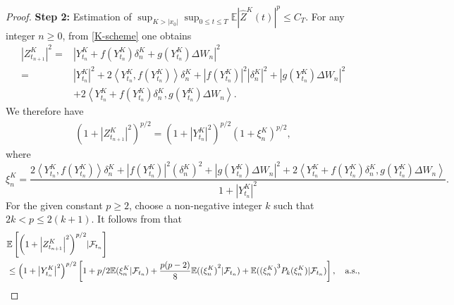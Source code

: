 \documentclass[preprint,12pt,compress]{elsarticle}
\begin{document}
\begin{proof}
\textbf{Step 2:} Estimation of ${\sup _{K > |{x_0}|}}{\sup _{0 \le t \le T}}\mathbb{E}{| {{{\hat Z}^K}(t)} |^p} \le {C_T}$.
For any integer $n \ge 0$, from \eqref{K-scheme} one obtains
	\begin{equation}  \label{a1}
		\begin{split}
			{\left| {Z_{{t_{n + 1}}}^K} \right|^2} =& {\left| {Y_{{t_n}}^K + f(Y_{{t_n}}^K){\delta _n^{K }} + g(Y_{{t_n}}^K)\Delta {W_n}} \right|^2} \\
			=& {\left| {{Y_{{t_n}}^K}} \right|^2} + 2\left\langle {{Y_{{t_n}}^K},f({Y_{{t_n}}^K})} \right\rangle \delta _n^{K }  + {\left| {f({Y_{{t_n}}^K})} \right|^2}{\left| {\delta _n^{K } } \right|^2} + {\left| {g(Y_{{t_n}}^K)\Delta {W_n}} \right|^2} \\
			&+ 2\left\langle {{Y_{{t_n}}^K} + f({Y_{{t_n}}^K})\delta _n^{K } ,g({Y_{{t_n}}^K})\Delta {W_n}} \right\rangle .
		\end{split}
	\end{equation}
	We therefore have
	\begin{equation}  \label{a6}
		\begin{split}
			{\left( {1 + {{\left| {Z_{{t_{n + 1}}}^K} \right|}^2}} \right)^{p/2}} = {\left( {1 + {{\left| {Y_{{t_n}}^K} \right|}^2}} \right)^{p/2}}{\left( {1 + \xi _n^{K }} \right)^{p/2}},
		\end{split}
	\end{equation}
	where
	\begin{equation}  \label{a26}
		\xi _n^{K } = \frac{{2\left\langle {Y_{{t_n}}^K,f(Y_{{t_n}}^K)} \right\rangle \delta _n^{K } + {{\left| {f(Y_{{t_n}}^K)} \right|}^2}{{\left( {\delta _n^{K }} \right)}^2} + {\left| {g(Y_{{t_n}}^K)\Delta {W_n}} \right|^2} + 2\left\langle {Y_{{t_n}}^K + f(Y_{{t_n}}^K)\delta _n^{K },g(Y_{{t_n}}^K)\Delta {W_n}} \right\rangle }}{{1 + {{\left| {Y_{{t_n}}^K} \right|}^2}}}.
	\end{equation}
	For the given constant $p \ge 2$, choose a non-negative integer $k$ such that $2k < p \le 2(k+1)$. It follows from \cite[Lemma 3.3]{yang2018explicit} that
	\begin{equation}  \label{sum1}
	\begin{split}
		&\mathbb{E}\left[ {{{\left( {1 + {{\left| {{Z_{{t_{n + 1}}}^K}} \right|}^2}} \right)}^{p/2}}|{{\cal F}_{{t_n}}}} \right] \\
		&\le {\left( {1 + {{\left| {{Y_{{t_n}}^K}} \right|}^2}} \right)^{p/2}}\left[ {1 + p/2\mathbb{E}(\xi _n^{K }|{{\cal F}_{{t_n}}}) + \frac{{p(p - 2)}}{8}\mathbb{E}({{(\xi _n^{K })}^2}|{{\cal F}_{{t_n}}}) + \mathbb{E}({{(\xi _n^{K })}^3}{P_k}(\xi _n^{K })|{{\cal F}_{{t_n}}})} \right], \quad \text{a.s.},

\end{split}
\end{equation}
\end{proof}
\end{document}
